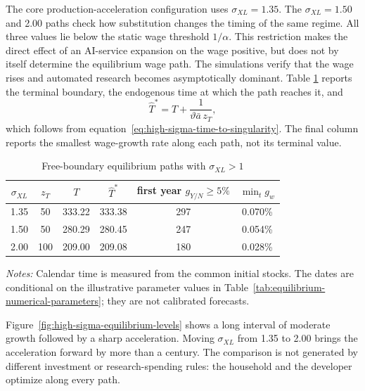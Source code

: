 The core production-acceleration configuration uses $\sigma_{XL}=1.35$. The
$\sigma_{XL}=1.50$ and 2.00 paths check how substitution changes the timing of the
same regime. All three values lie below the static wage threshold $1/\alpha$. This restriction
makes the direct effect of an AI-service expansion on the wage positive, but does
not by itself determine the equilibrium wage path. The simulations verify that the
wage rises and automated research becomes asymptotically dominant. Table
\ref{tab:high-sigma-equilibrium-summary} reports the terminal boundary, the
endogenous time at which the path reaches it, and
\begin{equation}
    \widehat T^*
    =
    T+\frac{1}{\vartheta\bar a\,z_T},
    \label{eq:estimated-singularity-time}
\end{equation}
which follows from equation~\eqref{eq:high-sigma-time-to-singularity}. The final
column reports the smallest wage-growth rate along each path, not its terminal
value.

\begin{table}[htbp]
    \centering
    \caption{Free-boundary equilibrium paths with $\sigma_{XL}>1$}
    \label{tab:high-sigma-equilibrium-summary}
    \begin{tabular}{cccccc}
        \toprule
        $\sigma_{XL}$ & $z_T$ & $T$ & $\widehat T^*$
        & first year $g_{Y/N}\geq5\%$ & $\min_t g_w$ \\
        \midrule
        1.35 & 50  & 333.22 & 333.38 & 297 & 0.070\% \\
        1.50 & 50  & 280.29 & 280.45 & 247 & 0.054\% \\
        2.00 & 100 & 209.00 & 209.08 & 180 & 0.028\% \\
        \bottomrule
    \end{tabular}
    \begin{minipage}{0.96\textwidth}
    \footnotesize\emph{Notes:} Calendar time is measured from the common initial
    stocks. The dates are conditional on the illustrative parameter values in
    Table~\ref{tab:equilibrium-numerical-parameters}; they are not calibrated
    forecasts.
    \end{minipage}
\end{table}

Figure~\ref{fig:high-sigma-equilibrium-levels} shows a long interval of moderate
growth followed by a sharp acceleration. Moving $\sigma_{XL}$ from 1.35 to 2.00
brings the acceleration forward by more than a century. The comparison is not
generated by different investment or research-spending rules: the household and
the developer optimize along every path.

